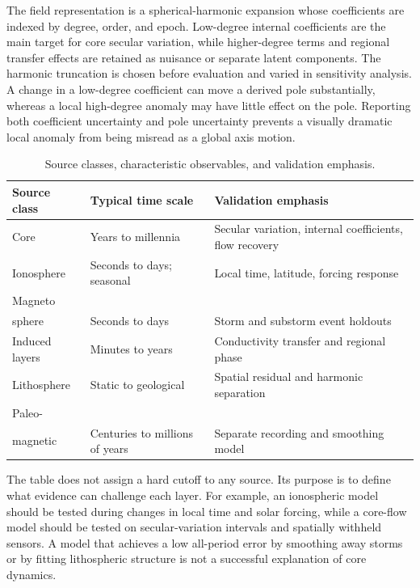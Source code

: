 \documentclass[conference]{IEEEtran}
\begin{document}
The field representation is a spherical-harmonic expansion whose coefficients are indexed by degree, order, and epoch. Low-degree internal coefficients are the main target for core secular variation, while higher-degree terms and regional transfer effects are retained as nuisance or separate latent components. The harmonic truncation is chosen before evaluation and varied in sensitivity analysis. A change in a low-degree coefficient can move a derived pole substantially, whereas a local high-degree anomaly may have little effect on the pole. Reporting both coefficient uncertainty and pole uncertainty prevents a visually dramatic local anomaly from being misread as a global axis motion.

\begin{table}[t]
\centering
\caption{Source classes, characteristic observables, and validation emphasis.}
\label{tab:timescales}
\footnotesize
\begin{tabular}{P{1.45cm}P{1.65cm}P{2.8cm}}
\toprule
Source class & Typical time scale & Validation emphasis \\
\midrule
Core & Years to millennia & Secular variation, internal coefficients, flow recovery \\
Ionosphere & Seconds to days; seasonal & Local time, latitude, forcing response \\
Magneto\\sphere & Seconds to days & Storm and substorm event holdouts \\
Induced layers & Minutes to years & Conductivity transfer and regional phase \\
Lithosphere & Static to geological & Spatial residual and harmonic separation \\
Paleo-\\magnetic & Centuries to millions of years & Separate recording and smoothing model \\
\bottomrule
\end{tabular}
\end{table}

The table does not assign a hard cutoff to any source. Its purpose is to define what evidence can challenge each layer. For example, an ionospheric model should be tested during changes in local time and solar forcing, while a core-flow model should be tested on secular-variation intervals and spatially withheld sensors. A model that achieves a low all-period error by smoothing away storms or by fitting lithospheric structure is not a successful explanation of core dynamics.
\end{document}
